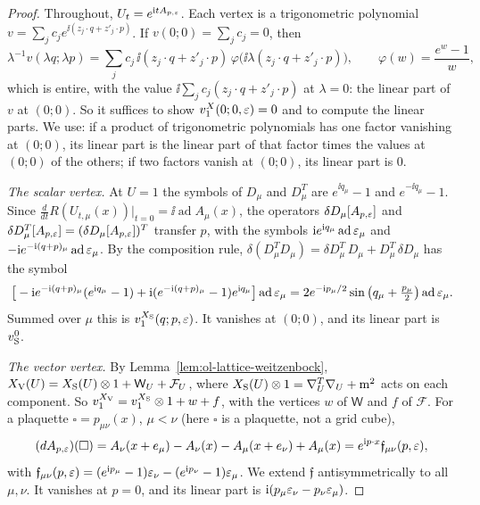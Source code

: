 \begin{proof}
Throughout, $U_t=e^{\mathrm i tA_{p,\varepsilon}}$. Each vertex is a trigonometric polynomial $v=\sum_jc_je^{\ii(z_j\cdot q+z'_j\cdot p)}$. If $v(0;0)=\sum_jc_j=0$, then
\[
\lambda^{-1}v(\lambda q;\lambda p)=\sum_jc_j\,\ii(z_j\cdot q+z'_j\cdot p)\,\varphi\big(\ii\lambda(z_j\cdot q+z'_j\cdot p)\big),\qquad\varphi(w)=\frac{e^w-1}w,
\]
which is entire, with the value $\ii\sum_jc_j(z_j\cdot q+z'_j\cdot p)$ at $\lambda=0$: the linear part of $v$ at $(0;0)$. So it suffices to show $v_1^X(0;0,\varepsilon)=0$ and to compute the linear parts. We use: if a product of trigonometric polynomials has one factor vanishing at $(0;0)$, its linear part is the linear part of that factor times the values at $(0;0)$ of the others; if two factors vanish at $(0;0)$, its linear part is $0$.

\emph{The scalar vertex.} At $U=1$ the symbols of $D_\mu$ and $D_\mu^T$ are $e^{\ii q_\mu}-1$ and $e^{-\ii q_\mu}-1$. Since $\frac d{dt}R(U_{t,\mu}(x))|_{t=0}=\ii\operatorname{ad}A_\mu(x)$, the operators $\delta D_\mu[A_{p,\varepsilon}]$ and $\delta D_\mu^T[A_{p,\varepsilon}]=(\delta D_\mu[A_{p,\varepsilon}])^T$ transfer $p$, with the symbols $\mathrm i e^{\mathrm i q_\mu}\operatorname{ad}\varepsilon_\mu$ and $-\mathrm i e^{-\mathrm i(q+p)_\mu}\operatorname{ad}\varepsilon_\mu$. By the composition rule, $\delta(D^T_\mu D_\mu)=\delta D_\mu^T\,D_\mu+D_\mu^T\,\delta D_\mu$ has the symbol
\[
\big[-\mathrm i e^{-\mathrm i(q+p)_\mu}(e^{\mathrm i q_\mu}-1)+\mathrm i(e^{-\mathrm i(q+p)_\mu}-1)e^{\mathrm i q_\mu}\big]\operatorname{ad}\varepsilon_\mu=2e^{-\mathrm i p_\mu/2}\sin\big(q_\mu+\tfrac{p_\mu}2\big)\operatorname{ad}\varepsilon_\mu .
\]
Summed over $\mu$ this is $v_1^{X_{\rm S}}(q;p,\varepsilon)$. It vanishes at $(0;0)$, and its linear part is $v^0_{\rm S}$.

\emph{The vector vertex.} By Lemma~\ref{lem:ol-lattice-weitzenbock}, $X_{\rm V}(U)=X_{\rm S}(U)\otimes1+\mathsf W_U+\mathcal F_U$, where $X_{\rm S}(U)\otimes1=\nabla_U^T\nabla_U+\mathrm m^2$ acts on each component. So $v_1^{X_{\rm V}}=v_1^{X_{\rm S}}\otimes1+w+f$, with the vertices $w$ of $\mathsf W$ and $f$ of $\mathcal F$. For a plaquette $\square=p_{\mu\nu}(x)$, $\mu<\nu$ (here $\square$ is a plaquette, not a grid cube),
\[
(dA_{p,\varepsilon})(\square)=A_\nu(x+e_\mu)-A_\nu(x)-A_\mu(x+e_\nu)+A_\mu(x)=e^{\mathrm i p\cdot x}\mathfrak f_{\mu\nu}(p,\varepsilon),
\]
with $\mathfrak f_{\mu\nu}(p,\varepsilon)=(e^{\mathrm i p_\mu}-1)\varepsilon_\nu-(e^{\mathrm i p_\nu}-1)\varepsilon_\mu$. We extend $\mathfrak f$ antisymmetrically to all $\mu,\nu$. It vanishes at $p=0$, and its linear part is $\mathrm i(p_\mu\varepsilon_\nu-p_\nu\varepsilon_\mu)$.


\end{proof}
